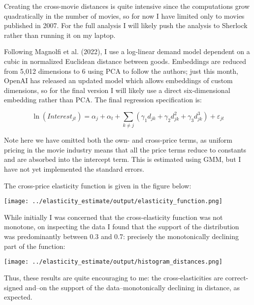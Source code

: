 \documentclass{article}
\begin{document}
Creating the cross-movie distances is quite intensive since the computations grow quadratically in the number of movies, so for now I have limited only to movies published in 2007. For the full analysis I will likely push the analysis to Sherlock rather than running it on my laptop. 

Following Magnolfi et al. (2022), I use a log-linear demand model dependent on a cubic in normalized Euclidean distance between goods. Embeddings are reduced from 5,012 dimensions to 6 using PCA to follow the authors; just this month, OpenAI has released an updated model which allows embeddings of custom dimensions, so for the final version I will likely use a direct six-dimensional embedding rather than PCA. The final regression specification is:

$$\ln(Interest_{jt}) = \alpha_j + \alpha_t + \sum_{k \neq j} \left(\gamma_1 d_{jk} + \gamma_2 d_{jk}^2 + \gamma_3 d_{jk}^3\right) + \varepsilon_{jt}$$

Note here we have omitted both the own- and cross-price terms, as uniform pricing in the movie industry means that all the price terms reduce to constants and are absorbed into the intercept term. This is estimated using GMM, but I have not yet implemented the standard errors. 

The cross-price elasticity function is given in the figure below:
\begin{center}
    \texttt{[image: ../elasticity\_estimate/output/elasticity\_function.png]}
\end{center}

While initially I was concerned that the cross-elasticity function was not monotone, on inspecting the data I found that the support of the distribution was predominantly between 0.3 and 0.7: precisely the monotonically declining part of the function:

\begin{center}
    \texttt{[image: ../elasticity\_estimate/output/histogram\_distances.png]}
\end{center}

Thus, these results are quite encouraging to me: the cross-elasticities are correct-signed and--on the support of the data--monotonically declining in distance, as expected. 
\end{document}
